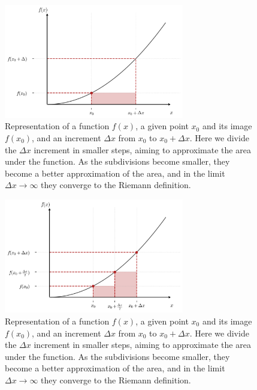 \documentclass{book}
\begin{document}
\begin{figure}[ht]
    \centering
    \includegraphics[width=0.7\textwidth]{figures/appendix/integrals_2.png}
    \caption{Representation of a function $f(x)$, a given point $x_0$ and its image $f(x_0)$, and an increment $\Delta x$ from $x_0$ to $x_0 + \Delta x$. Here we divide the $\Delta x$ increment in smaller steps, aiming to approximate the area under the function. As the subdivisions become smaller, they become a better approximation of the area, and in the limit $\Delta x \rightarrow \infty$ they converge to the Riemann definition.}
    \label{fig:integrals_2}
\end{figure}

\begin{figure}[ht]
    \centering
    \includegraphics[width=0.7\textwidth]{figures/appendix/integrals_2_subdivisions.png}
    \caption{Representation of a function $f(x)$, a given point $x_0$ and its image $f(x_0)$, and an increment $\Delta x$ from $x_0$ to $x_0 + \Delta x$. Here we divide the $\Delta x$ increment in smaller steps, aiming to approximate the area under the function. As the subdivisions become smaller, they become a better approximation of the area, and in the limit $\Delta x \rightarrow \infty$ they converge to the Riemann definition.}    \label{fig:integrals_2_subdivisions}
\end{figure}
\end{document}
